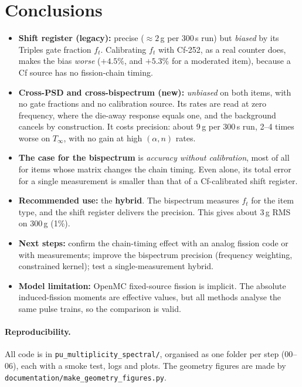 \documentclass[11pt,a4paper]{article}
\newcommand{\Tinf}{T_\infty}
\begin{document}
\section{Conclusions}
\begin{itemize}
  \item \textbf{Shift register (legacy):} precise ($\approx2$\,g per 300\,s run) but
        \emph{biased} by its Triples gate fraction $f_t$. Calibrating $f_t$ with Cf-252, as a
        real counter does, makes the bias \emph{worse} ($+4.5\%$, and $+5.3\%$ for a moderated
        item), because a Cf source has no fission-chain timing.
  \item \textbf{Cross-PSD and cross-bispectrum (new):} \emph{unbiased} on both items, with
        no gate fractions and no calibration source. Its rates are read at zero frequency,
        where the die-away response equals one, and the background cancels by construction.
        It costs precision: about 9\,g per 300\,s run, 2--4 times worse on $\Tinf$, with no
        gain at high $(\alpha,n)$ rates.
  \item \textbf{The case for the bispectrum} is \emph{accuracy without calibration}, most of
        all for items whose matrix changes the chain timing. Even alone, its total error for a
        single measurement is smaller than that of a Cf-calibrated shift register.
  \item \textbf{Recommended use:} the \textbf{hybrid}. The bispectrum measures $f_t$ for the
        item type, and the shift register delivers the precision. This gives about 3\,g RMS
        on 300\,g (1\%).
  \item \textbf{Next steps:} confirm the chain-timing effect with an analog fission code or
        with measurements; improve the bispectrum precision (frequency weighting, constrained
        kernel); test a single-measurement hybrid.
  \item \textbf{Model limitation:} OpenMC fixed-source fission is implicit. The absolute
        induced-fission moments are effective values, but all methods analyse the same pulse
        trains, so the comparison is valid.
\end{itemize}

\paragraph{Reproducibility.} All code is in \texttt{pu\_multiplicity\_spectral/}, organised
as one folder per step (00--06), each with a smoke test, logs and plots. The geometry figures
are made by \nolinkurl{documentation/make_geometry_figures.py}.
\end{document}

